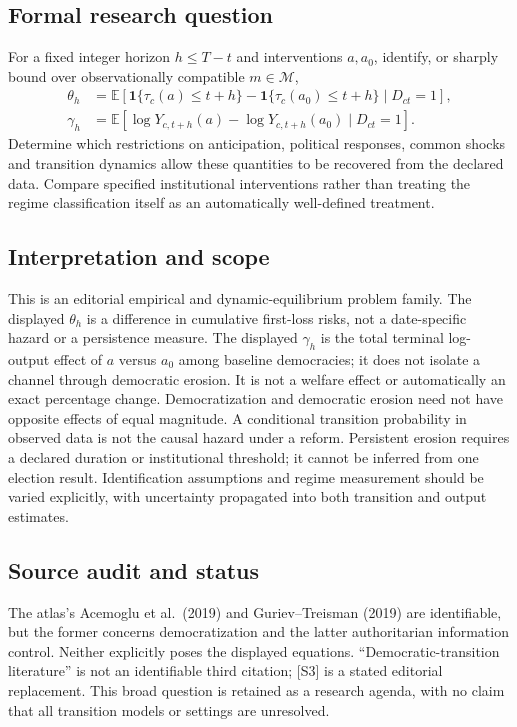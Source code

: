 \documentclass[11pt,a4paper]{article}
\begin{document}
\subsection*{Formal research question}
For a fixed integer horizon $h\leq T-t$ and interventions $a,a_0$, identify, or sharply bound over observationally compatible $m\in\mathcal M$,
\[
\begin{aligned}
\theta_h&=\mathbb E\!\left[\mathbf1\{\tau_c(a)\leq t+h\}-\mathbf1\{\tau_c(a_0)\leq t+h\}\mid D_{ct}=1\right],\\
\gamma_h&=\mathbb E[\log Y_{c,t+h}(a)-\log Y_{c,t+h}(a_0)\mid D_{ct}=1].
\end{aligned}
\]
Determine which restrictions on anticipation, political responses, common shocks and transition dynamics allow these quantities to be recovered from the declared data. Compare specified institutional interventions rather than treating the regime classification itself as an automatically well-defined treatment.
\subsection*{Interpretation and scope}
This is an editorial empirical and dynamic-equilibrium problem family. The displayed $\theta_h$ is a difference in cumulative first-loss risks, not a date-specific hazard or a persistence measure. The displayed $\gamma_h$ is the total terminal log-output effect of $a$ versus $a_0$ among baseline democracies; it does not isolate a channel through democratic erosion. It is not a welfare effect or automatically an exact percentage change. Democratization and democratic erosion need not have opposite effects of equal magnitude. A conditional transition probability in observed data is not the causal hazard under a reform. Persistent erosion requires a declared duration or institutional threshold; it cannot be inferred from one election result. Identification assumptions and regime measurement should be varied explicitly, with uncertainty propagated into both transition and output estimates.
\subsection*{Source audit and status}
The atlas's Acemoglu et al.\ (2019) and Guriev--Treisman (2019) are identifiable, but the former concerns democratization and the latter authoritarian information control. Neither explicitly poses the displayed equations. ``Democratic-transition literature'' is not an identifiable third citation; [S3] is a stated editorial replacement. This broad question is retained as a research agenda, with no claim that all transition models or settings are unresolved.
\end{document}
